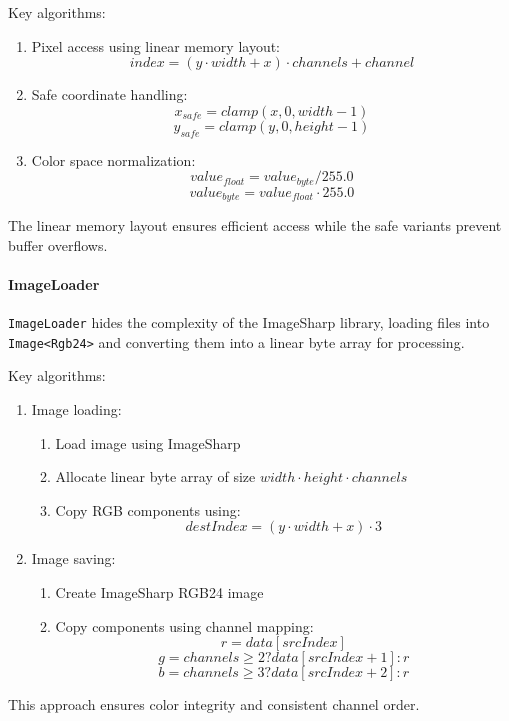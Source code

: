 \documentclass[12pt,a4paper]{report}
\begin{document}
Key algorithms:
\begin{enumerate}
    \item Pixel access using linear memory layout:
    \[ index = (y \cdot width + x) \cdot channels + channel \]
    
    \item Safe coordinate handling:
    \[ x_{safe} = clamp(x, 0, width-1) \]
    \[ y_{safe} = clamp(y, 0, height-1) \]
    
    \item Color space normalization:
    \[ value_{float} = value_{byte} / 255.0 \]
    \[ value_{byte} = value_{float} \cdot 255.0 \]
\end{enumerate}

The linear memory layout ensures efficient access while the safe variants prevent buffer overflows.

\paragraph{ImageLoader}
\texttt{ImageLoader} hides the complexity of the ImageSharp library, loading files into \texttt{Image<Rgb24>} and converting them into a linear byte array for processing.

Key algorithms:
\begin{enumerate}
    \item Image loading:
    \begin{enumerate}
        \item Load image using ImageSharp
        \item Allocate linear byte array of size $width \cdot height \cdot channels$
        \item Copy RGB components using:
        \[ destIndex = (y \cdot width + x) \cdot 3 \]
    \end{enumerate}
    
    \item Image saving:
    \begin{enumerate}
        \item Create ImageSharp RGB24 image
        \item Copy components using channel mapping:
        \[ r = data[srcIndex] \]
        \[ g = channels \geq 2 ? data[srcIndex + 1] : r \]
        \[ b = channels \geq 3 ? data[srcIndex + 2] : r \]
    \end{enumerate}
\end{enumerate}

This approach ensures color integrity and consistent channel order.
\end{document}
